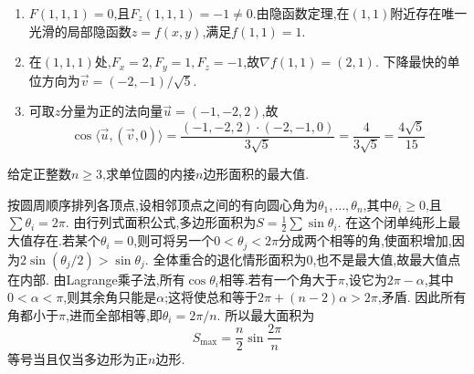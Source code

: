 \documentclass{ctexart}
\begin{document}
\begin{solution}
\begin{enumerate}[label=\tbf{(\arabic*)},leftmargin=*]
\item $F(1,1,1)=0$,且$F_z(1,1,1)=-1\neq0$.由隐函数定理,在$(1,1)$附近存在唯一光滑的局部隐函数$z=f(x,y)$,满足$f(1,1)=1$.
\item 在$(1,1,1)$处,$F_x=2,F_y=1,F_z=-1$,故$\nabla f(1,1)=(2,1)$.
下降最快的单位方向为$\vec v=(-2,-1)/\sqrt5$.
\item 可取$z$分量为正的法向量$\vec u=(-1,-2,2)$,故
\[\cos\langle\vec u,(\vec v,0)\rangle
=\dfrac{(-1,-2,2)\cdot(-2,-1,0)}{3\sqrt5}=\dfrac4{3\sqrt5}=\dfrac{4\sqrt5}{15}\]
\end{enumerate}
\end{solution}
\begin{problem}[7.(10\songti{分})]
给定正整数$n\geqslant 3$,求单位圆的内接$n$边形面积的最大值.
\end{problem}
\begin{solution}
按圆周顺序排列各顶点,设相邻顶点之间的有向圆心角为$\theta_1,\ldots,\theta_n$,其中$\theta_i\geqslant0$,且$\sum\theta_i=2\pi$.
由行列式面积公式,多边形面积为$S=\frac12\sum\sin\theta_i$.
在这个闭单纯形上最大值存在.若某个$\theta_i=0$,则可将另一个$0<\theta_j<2\pi$分成两个相等的角,使面积增加,因为$2\sin(\theta_j/2)>\sin\theta_j$.
全体重合的退化情形面积为$0$,也不是最大值,故最大值点在内部.
由Lagrange乘子法,所有$\cos\theta_i$相等.若有一个角大于$\pi$,设它为$2\pi-\alpha$,其中$0<\alpha<\pi$,则其余角只能是$\alpha$;这将使总和等于$2\pi+(n-2)\alpha>2\pi$,矛盾.
因此所有角都小于$\pi$,进而全部相等,即$\theta_i=2\pi/n$.
所以最大面积为
\[S_{\max}=\dfrac n2\sin\dfrac{2\pi}{n}\]
等号当且仅当多边形为正$n$边形.
\end{solution}
\end{document}
